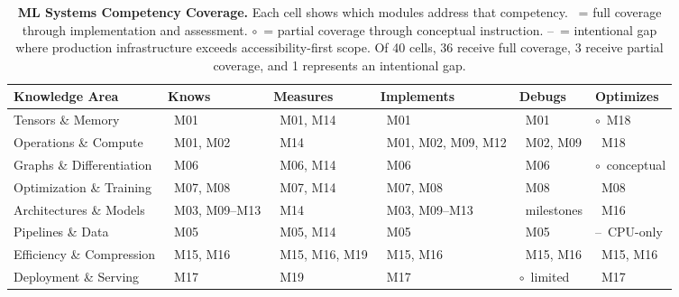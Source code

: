 \documentclass[10pt,twocolumn]{article}
\newcommand{\fullmark}{\checkmark}
\newcommand{\halfmark}{$\circ$}
\newcommand{\emptymark}{--}
\begin{document}
\begin{table}[t]
\centering
\caption{\textbf{ML Systems Competency Coverage.} Each cell shows which modules address that competency. \fullmark~= full coverage through implementation and assessment. \halfmark~= partial coverage through conceptual instruction. \emptymark~= intentional gap where production infrastructure exceeds accessibility-first scope. Of 40 cells, 36 receive full coverage, 3 receive partial coverage, and 1 represents an intentional gap.}
\label{tab:coverage}
\small
\renewcommand{\arraystretch}{1.4}
\setlength{\tabcolsep}{6pt}
\begin{tabularx}{0.98\textwidth}{@{}>{\raggedright\arraybackslash}p{2.4cm}>{\raggedright\arraybackslash}X>{\raggedright\arraybackslash}X>{\raggedright\arraybackslash}X>{\raggedright\arraybackslash}X>{\raggedright\arraybackslash}X@{}}
\toprule
\textbf{Knowledge Area} & \textbf{Knows} & \textbf{Measures} & \textbf{Implements} & \textbf{Debugs} & \textbf{Optimizes} \\
\midrule
Tensors \& Memory & \fullmark~M01 & \fullmark~M01, M14 & \fullmark~M01 & \fullmark~M01 & \halfmark~M18 \\
\addlinespace[2pt]
Operations \& Compute & \fullmark~M01, M02 & \fullmark~M14 & \fullmark~M01, M02, M09, M12 & \fullmark~M02, M09 & \fullmark~M18 \\
\addlinespace[2pt]
Graphs \& Differentiation & \fullmark~M06 & \fullmark~M06, M14 & \fullmark~M06 & \fullmark~M06 & \halfmark~conceptual \\
\addlinespace[2pt]
Optimization \& Training & \fullmark~M07, M08 & \fullmark~M07, M14 & \fullmark~M07, M08 & \fullmark~M08 & \fullmark~M08 \\
\addlinespace[2pt]
Architectures \& Models & \fullmark~M03, M09--M13 & \fullmark~M14 & \fullmark~M03, M09--M13 & \fullmark~milestones & \fullmark~M16 \\
\addlinespace[2pt]
Pipelines \& Data & \fullmark~M05 & \fullmark~M05, M14 & \fullmark~M05 & \fullmark~M05 & \emptymark~CPU-only \\
\addlinespace[2pt]
Efficiency \& Compression & \fullmark~M15, M16 & \fullmark~M15, M16, M19 & \fullmark~M15, M16 & \fullmark~M15, M16 & \fullmark~M15, M16 \\
\addlinespace[2pt]
Deployment \& Serving & \fullmark~M17 & \fullmark~M19 & \fullmark~M17 & \halfmark~limited & \fullmark~M17 \\
\bottomrule
\end{tabularx}
\end{table}
\end{document}
